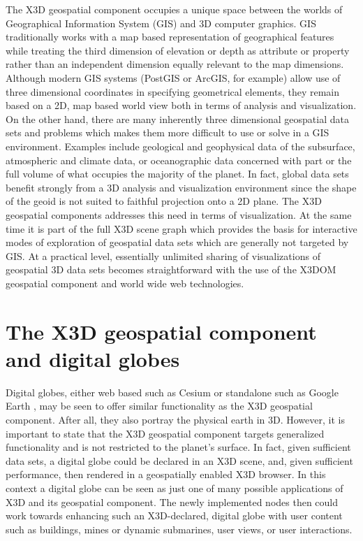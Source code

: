 \documentclass{acmsiggraph}                     %
\begin{document}
The X3D geospatial component occupies a unique space between the worlds of Geographical Information
System (GIS) and 3D computer graphics. GIS traditionally works with a map based representation of
geographical features while treating the third dimension of elevation or depth as attribute or
property rather than an independent dimension equally relevant to the map dimensions. Although
modern GIS systems (PostGIS or ArcGIS, for example) allow use of three dimensional coordinates in
specifying geometrical elements, they remain based on a 2D, map based world view both in terms of
analysis and visualization. On the other hand, there are many inherently three dimensional
geospatial data sets and problems which makes them more difficult to use or solve in a GIS
environment.  Examples include geological and geophysical data of the subsurface, atmospheric and
climate data, or oceanographic data concerned with part or the full volume of what occupies the
majority of the planet. In fact, global data sets benefit strongly from a 3D analysis and
visualization environment since the shape of the geoid is not suited to faithful projection onto a
2D plane. The X3D geospatial components addresses this need in terms of visualization. At the same
time it is part of the full X3D scene graph which provides the basis for interactive modes of
exploration of geospatial data sets which are generally not targeted by GIS. At a practical level,
essentially unlimited sharing of visualizations of geospatial 3D data sets becomes straightforward
with the use of the X3DOM geospatial component and world wide web technologies.


\section{The X3D geospatial component and digital globes}

Digital globes, either web based such as Cesium \cite{cesium15} or standalone such as Google Earth
\cite{googleearth15}, may be seen to offer similar functionality as the X3D geospatial component.
After all, they also portray the physical earth in 3D. However, it is important to state that the
X3D geospatial component targets generalized functionality and is not restricted to the planet's
surface. In fact, given sufficient data sets, a digital globe could be declared in an X3D scene,
and, given sufficient performance, then rendered in a geospatially enabled X3D browser. In this
context a digital globe can be seen as just one of many possible applications of X3D and its
geospatial component. The newly implemented nodes then could work towards enhancing such an
X3D-declared, digital globe with user content such as buildings, mines or dynamic submarines, user
views, or user interactions.
\end{document}

